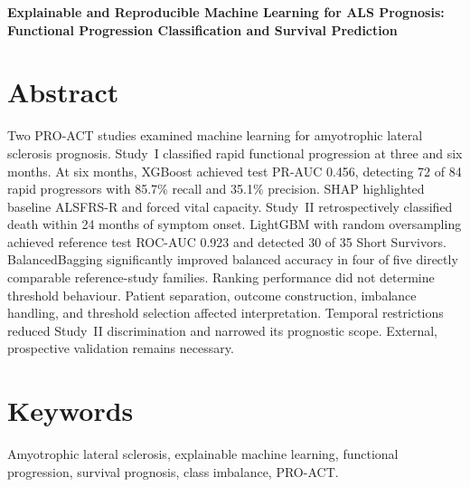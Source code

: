 \begin{center}
\textbf{Explainable and Reproducible Machine Learning for ALS Prognosis: Functional Progression Classification and Survival Prediction}
\end{center}

\section*{Abstract}
\label{sec:abstract}

Two PRO-ACT studies examined machine learning for amyotrophic lateral sclerosis prognosis. Study~I classified rapid functional progression at three and six months. At six months, XGBoost achieved test PR-AUC 0.456, detecting 72 of 84 rapid progressors with 85.7\% recall and 35.1\% precision. SHAP highlighted baseline ALSFRS-R and forced vital capacity. Study~II retrospectively classified death within 24 months of symptom onset. LightGBM with random oversampling achieved reference test ROC-AUC 0.923 and detected 30 of 35 Short Survivors. BalancedBagging significantly improved balanced accuracy in four of five directly comparable reference-study families. Ranking performance did not determine threshold behaviour. Patient separation, outcome construction, imbalance handling, and threshold selection affected interpretation. Temporal restrictions reduced Study~II discrimination and narrowed its prognostic scope. External, prospective validation remains necessary.

\section*{Keywords}
\label{sec:keywords}

Amyotrophic lateral sclerosis, explainable machine learning, functional progression, survival prognosis, class imbalance, PRO-ACT.
